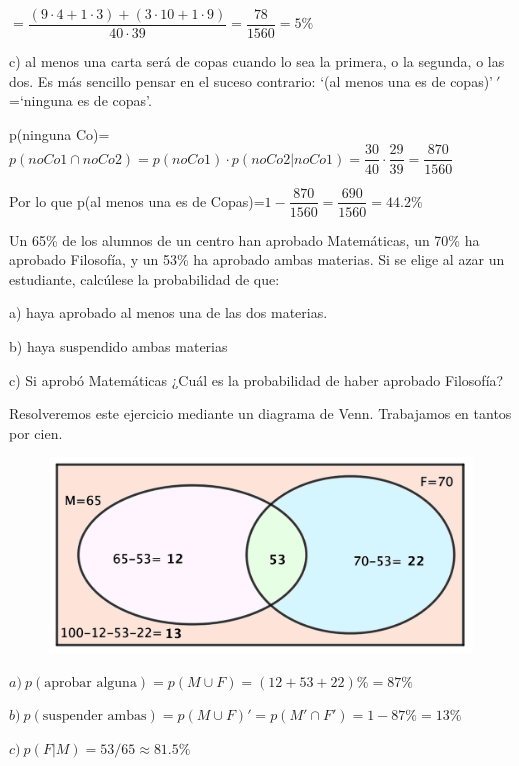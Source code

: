 $=\dfrac{(9\cdot 4+1\cdot 3)+(3\cdot 10 + 1\cdot 9)}{40\cdot 39}=\dfrac{78}{1560}=5\%$

c) al menos una carta será de copas cuando lo sea la primera, o la segunda, o las dos. Es más sencillo pensar en el suceso contrario: `(al menos una es de copas)'$ \ '$=`ninguna es de copas'.

p(ninguna Co)=$p(noCo1 \cap noCo2)=p(noCo1)\cdot p(noCo2|noCo1)=\dfrac {30}{40}\cdot \dfrac {29}{39}=\dfrac{870}{1560}$

Por lo que p(al menos una es de Copas)=$1-\dfrac{870}{1560}=\dfrac{690}{1560}=44.2\%$

\vspace{5mm}
\begin{ejemplo}
\begin{ejer}
Un 65\% de los alumnos de un centro han aprobado Matemáticas, un 70\% ha aprobado Filosofía, y un 53\% ha aprobado ambas materias. Si se elige al azar un estudiante, calcúlese la probabilidad de que: 

a) haya aprobado al menos una de las dos materias.

b) haya suspendido ambas materias

c) Si aprobó Matemáticas ¿Cuál es la probabilidad de haber aprobado Filosofía? 	
\end{ejer}
\end{ejemplo}
Resolveremos este ejercicio mediante un diagrama de Venn. Trabajamos en tantos por cien.

	\begin{figure}[H]
				\centering
			\includegraphics[width=.55\textwidth]{imagenes/imagenes02/T02IM29.png}
	\end{figure}

$a)\ p(\text{aprobar alguna})=p(M\cup F)=(12+53+22)\%=87\%$

$b)\ p(\text{suspender ambas})=p(M\cup F)'=p(M'\cap F')=1-87\%=13\%$

$c)\ p(F|M)=53/65\approx 81.5\%$

